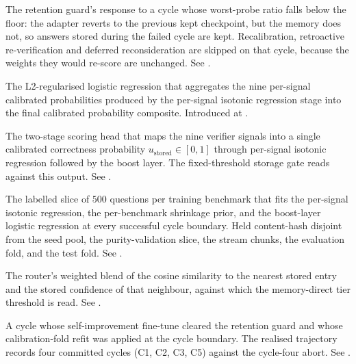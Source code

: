 \begin{description}[style=nextline, leftmargin=0pt, labelindent=0pt, itemsep=6pt, parsep=0pt, font=\bfseries, beginpenalty=10000]

\item[Asymmetric rollback:] The retention guard's response to a cycle whose worst-probe ratio falls below the floor: the adapter reverts to the previous kept checkpoint, but the memory does not, so answers stored during the failed cycle are kept. Recalibration, retroactive re-verification and deferred reconsideration are skipped on that cycle, because the weights they would re-score are unchanged. See .

\item[Boost layer:] The L2-regularised logistic regression that aggregates the nine per-signal calibrated probabilities produced by the per-signal isotonic regression stage into the final calibrated probability composite. Introduced at .

\item[Calibrated-probability composite:] The two-stage scoring head that maps the nine verifier signals into a single calibrated correctness probability $u_{\text{stored}} \in [0, 1]$ through per-signal isotonic regression followed by the boost layer. The fixed-threshold storage gate reads against this output. See .

\item[Calibration fold:] The labelled slice of $500$ questions per training benchmark that fits the per-signal isotonic regression, the per-benchmark shrinkage prior, and the boost-layer logistic regression at every successful cycle boundary. Held content-hash disjoint from the seed pool, the purity-validation slice, the stream chunks, the evaluation fold, and the test fold. See .

\item[Combined dispatch score:] The router's weighted blend of the cosine similarity to the nearest stored entry and the stored confidence of that neighbour, against which the memory-direct tier threshold is read. See .

\item[Committed cycle:] A cycle whose self-improvement fine-tune cleared the retention guard and whose calibration-fold refit was applied at the cycle boundary. The realised trajectory records four committed cycles (C1, C2, C3, C5) against the cycle-four abort. See .


\end{description}
